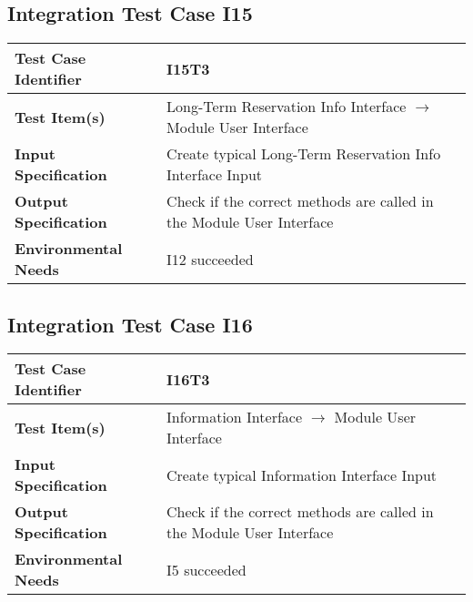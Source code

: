 \subsection{Integration Test Case I15}
\begin{tabular}{l p{9cm}}
	\hline
	\textbf{Test	Case Identifier} & I15T3 \\ \hline
	\textbf{Test	Item(s)} & Long-Term Reservation Info Interface $\rightarrow$ Module User Interface \\ \hline
	\textbf{Input Specification} & Create typical Long-Term Reservation Info Interface Input\\ \hline
	\textbf{Output Specification} & Check if the correct methods are called in the Module User Interface \\ \hline
	\textbf{Environmental Needs} & I12 succeeded \\ \hline
\end{tabular}
\vspace{0.5cm}
\subsection{Integration Test Case I16}
\begin{tabular}{l p{9cm}}
	\hline
	\textbf{Test	Case Identifier} & I16T3 \\ \hline
	\textbf{Test	Item(s)} & Information Interface $\rightarrow$ Module User Interface \\ \hline
	\textbf{Input Specification} & Create typical Information Interface Input\\ \hline
	\textbf{Output Specification} & Check if the correct methods are called in the Module User Interface \\ \hline
	\textbf{Environmental Needs} & I5 succeeded \\ \hline
\end{tabular}
